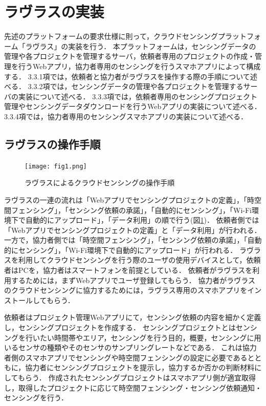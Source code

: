 \section{ラヴラスの実装}
先述のプラットフォームの要求仕様に則って，クラウドセンシングプラットフォーム「ラヴラス」の実装を行う．
本プラットフォームは，センシングデータの管理や各プロジェクトを管理するサーバ，依頼者専用のプロジェクトの作成・管理を行うWebアプリ，協力者専用のセンシングを行うスマホアプリによって構成する．
3.3.1項では，依頼者と協力者がラヴラスを操作する際の手順について述べる．
3.3.2項では，センシングデータの管理や各プロジェクトを管理するサーバの実装について述べる．
3.3.3項では，依頼者専用のセンシングプロジェクト管理やセンシングデータダウンロードを行うWebアプリの実装について述べる．
3.3.4項では，協力者専用のセンシングスマホアプリの実装について述べる．


\subsection{ラヴラスの操作手順}

\begin{figure}[H]
    \centering
    \texttt{[image: fig1.png]}
    \caption{ラヴラスによるクラウドセンシングの操作手順}
    \label{fig:1}
\end{figure}

ラヴラスの一連の流れは「Webアプリでセンシングプロジェクトの定義」，「時空間フェンシング」，「センシング依頼の承諾」，「自動的にセンシング」，「Wi-Fi環境下で自動的にアップロード」，「データ利用」の順で行う(図\ref{fig:1})．
依頼者側では「Webアプリでセンシングプロジェクトの定義」と「データ利用」が行われる．
一方で，協力者側では「時空間フェンシング」，「センシング依頼の承諾」，「自動的にセンシング」，「Wi-Fi環境下で自動的にアップロード」が行われる．
ラヴラスを利用してクラウドセンシングを行う際のユーザの使用デバイスとして，依頼者はPCを，協力者はスマートフォンを前提としている．
依頼者がラヴラスを利用するためには，まずWebアプリでユーザ登録してもらう．
協力者がラヴラスのクラウドセンシングに協力するためには，ラヴラス専用のスマホアプリをインストールしてもらう．

依頼者はプロジェクト管理Webアプリにて，センシング依頼の内容を細かく定義し，センシングプロジェクトを作成する．
センシングプロジェクトとはセンシングを行いたい時間帯やエリア，センシングを行う目的，概要，センシングに用いるセンサの種類やそのセンサのサンプリングレートなどである．
これは協力者側のスマホアプリでセンシングや時空間フェンシングの設定に必要であるとともに，協力者にセンシングプロジェクトを提示し，協力するか否かの判断材料にしてもらう．
作成されたセンシングプロジェクトはスマホアプリ側が適宜取得し，取得したプロジェクトに応じて時空間フェンシング・センシング依頼通知・センシングを行う．

